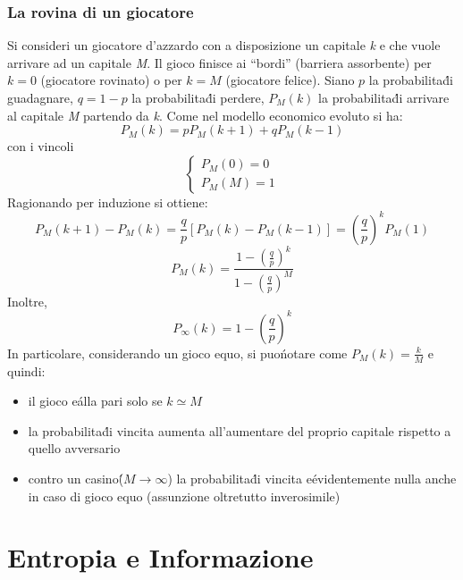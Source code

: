 \documentclass[12pt, a4paper]{book}
\theoremstyle{theorem}
\begin{document}
			\subsection{La rovina di un giocatore}
				Si consideri un giocatore d'azzardo con a disposizione un capitale \textit{k} e che vuole arrivare ad un capitale \textit{M}.
				Il gioco finisce ai ``bordi'' (barriera assorbente) per $k=0$ (giocatore rovinato) o per $k=M$ (giocatore felice).
				Siano $p$ la probabilita\' di guadagnare, $q=1-p$ la probabilita\' di perdere, $P_M(k)$ la probabilita\' di arrivare al capitale \textit{M} partendo da \textit{k}.
				Come nel modello economico evoluto si ha:
				\begin{equation*}
					P_M(k)=pP_M(k+1)+qP_M(k-1)
				\end{equation*}
				con i vincoli
				\begin{equation*}
					\begin{cases}
						P_M(0)=0\\
						P_M(M)=1
					\end{cases}
				\end{equation*}
				Ragionando per induzione si ottiene:
				\begin{equation*}
					P_M(k+1)-P_M(k)=\frac{q}{p}\left[P_M(k)-P_M(k-1)\right]=\left(\frac{q}{p}\right)^kP_M(1)
				\end{equation*}
				\begin{equation}
					P_M(k)=\frac{1-\left(\frac{q}{p}\right)^k}{1-\left(\frac{q}{p}\right)^M}
				\end{equation}
				Inoltre,
				\begin{equation}
					P_\infty(k)=1-\left(\frac{q}{p}\right)^k
				\end{equation}
				In particolare, considerando un gioco equo, si puo\' notare come $P_M(k)=\frac{k}{M}$ e quindi:
				\begin{itemize}
					\item il gioco e\' alla pari solo se $k\simeq M$
					\item la probabilita\' di vincita aumenta all'aumentare del proprio capitale rispetto a quello avversario
					\item contro un casino\' ($M\to\infty$) la probabilita\' di vincita e\' evidentemente nulla anche in caso di gioco equo (assunzione oltretutto inverosimile)
				\end{itemize}
	
	\chapter{Entropia e Informazione} %
\end{document}
